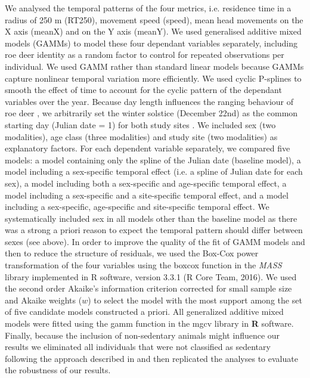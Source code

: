 \documentclass[a4paper,11pt]{article}
\begin{document}
We analysed the temporal patterns of the four metrics, i.e. residence
time in a radius of 250 m (RT250), movement speed (speed), mean head
movements on the X axis (meanX) and on the Y axis (meanY). We used
generalised additive mixed models (GAMMs) to model these four
dependant variables separately, including roe deer identity as a
random factor to control for repeated observations per individual. We
used GAMM rather than standard linear models because GAMMs capture
nonlinear temporal variation more efficiently. We used cyclic
P-splines to smooth the effect of time to account for the cyclic
pattern of the dependant variables over the year. Because day length
influences the ranging behaviour of roe deer
\citep{borger_integrated_2006}, we arbitrarily set the winter solstice
(December 22nd) as the common starting day (Julian date = 1) for both
study sites \cite[see also][]{morellet_seasonality_2013}. We included
sex (two modalities), age class (three modalities) and study site (two
modalities) as explanatory factors. For each dependent variable
separately, we compared five models: a model containing only the
spline of the Julian date (baseline model), a model including a
sex-specific temporal effect (i.e. a spline of Julian date for each
sex), a model including both a sex-specific and age-specific temporal
effect, a model including a sex-specific and a site-specific temporal
effect, and a model including a sex-specific, age-specific and
site-specific temporal effect. We systematically included sex in all
models other than the baseline model as there was a strong a priori
reason to expect the temporal pattern should differ between sexes (see
above). In order to improve the quality of the fit of GAMM models and
then to reduce the structure of residuals, we used the Box-Cox power
transformation of the four variables using the boxcox function in the
\textit{MASS} library implemented in R software, version 3.3.1 (R Core
Team, 2016). We used the second order Akaike’s information criterion
corrected for small sample size \citep[AICc,][]{burnham_model_1998} and
Akaike weights ($w$) to select the model with the most support among
the set of five candidate models constructed a priori. All generalized
additive mixed models were fitted using the \textsf{gamm} function in the
\textsf{mgcv} library \cite{wood_generalized_2006} in \textbf{\textsf{R}}
software.  Finally, because the inclusion of
non-sedentary animals might influence our results we eliminated all individuals that were not classified as sedentary following the approach described in
\cite{cagnacci_partial_2011} and then replicated the analyses to evaluate the
robustness of our results.
\end{document}

